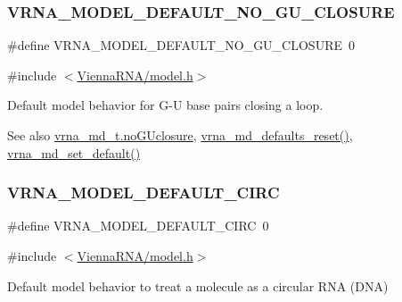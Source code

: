 \subsubsection{\texorpdfstring{V\+R\+N\+A\+\_\+\+M\+O\+D\+E\+L\+\_\+\+D\+E\+F\+A\+U\+L\+T\+\_\+\+N\+O\+\_\+\+G\+U\+\_\+\+C\+L\+O\+S\+U\+RE}{VRNA\_MODEL\_DEFAULT\_NO\_GU\_CLOSURE}}
{\footnotesize\ttfamily \#define V\+R\+N\+A\+\_\+\+M\+O\+D\+E\+L\+\_\+\+D\+E\+F\+A\+U\+L\+T\+\_\+\+N\+O\+\_\+\+G\+U\+\_\+\+C\+L\+O\+S\+U\+RE~0}



{\ttfamily \#include $<$\mbox{\hyperlink{model_8h}{Vienna\+R\+N\+A/model.\+h}}$>$}



Default model behavior for G-\/U base pairs closing a loop. 

\begin{DoxySeeAlso}{See also}
\mbox{\hyperlink{group__model__details_a7e883db1f33f8f3baa5c9b140350c78e}{vrna\+\_\+md\+\_\+t.\+no\+G\+Uclosure}}, \mbox{\hyperlink{group__model__details_ga70834424cf804d149937de89f80ceb45}{vrna\+\_\+md\+\_\+defaults\+\_\+reset()}}, \mbox{\hyperlink{group__model__details_ga8ac6ff84936282436f822644bf841f66}{vrna\+\_\+md\+\_\+set\+\_\+default()}} 
\end{DoxySeeAlso}
\mbox{\label{group__model__details_ga22059033db7bcd875c51fec32425490a}} 
\subsubsection{\texorpdfstring{V\+R\+N\+A\+\_\+\+M\+O\+D\+E\+L\+\_\+\+D\+E\+F\+A\+U\+L\+T\+\_\+\+C\+I\+RC}{VRNA\_MODEL\_DEFAULT\_CIRC}}
{\footnotesize\ttfamily \#define V\+R\+N\+A\+\_\+\+M\+O\+D\+E\+L\+\_\+\+D\+E\+F\+A\+U\+L\+T\+\_\+\+C\+I\+RC~0}



{\ttfamily \#include $<$\mbox{\hyperlink{model_8h}{Vienna\+R\+N\+A/model.\+h}}$>$}



Default model behavior to treat a molecule as a circular R\+NA (D\+NA) 

